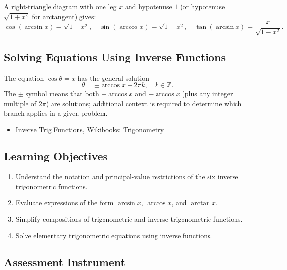 A right-triangle diagram with one leg $x$ and hypotenuse $1$ (or
hypotenuse $\sqrt{1+x^{2}}$ for arctangent) gives:
\[
  \cos(\arcsin x) = \sqrt{1 - x^{2}}, \quad
  \sin(\arccos x) = \sqrt{1 - x^{2}}, \quad
  \tan(\arcsin x) = \frac{x}{\sqrt{1 - x^{2}}}.
\]

\subsection*{Solving Equations Using Inverse Functions}

The equation $\cos\theta = x$ has the general solution
\[
  \theta = \pm\arccos x + 2\pi k, \quad k \in \mathbb{Z}.
\]
The $\pm$ symbol means that both $+\arccos x$ and $-\arccos x$ (plus any
integer multiple of $2\pi$) are solutions; additional context is required to
determine which branch applies in a given problem.

\begin{itemize}
  \item \href{https://en.wikibooks.org/wiki/Trigonometry/Inverse_Trigonometric_Functions}{Inverse Trig Functions, Wikibooks: Trigonometry}
\end{itemize}

\subsection{Learning Objectives}
\label{ssec:lear-fe6e}

\begin{enumerate}
    \item Understand the notation and principal-value restrictions of the six inverse trigonometric functions.
    \item Evaluate expressions of the form $\arcsin x$, $\arccos x$, and $\arctan x$.
    \item Simplify compositions of trigonometric and inverse trigonometric functions.
    \item Solve elementary trigonometric equations using inverse functions.
\end{enumerate}

\subsection{Assessment Instrument}
\label{ssec:asse-3669}

